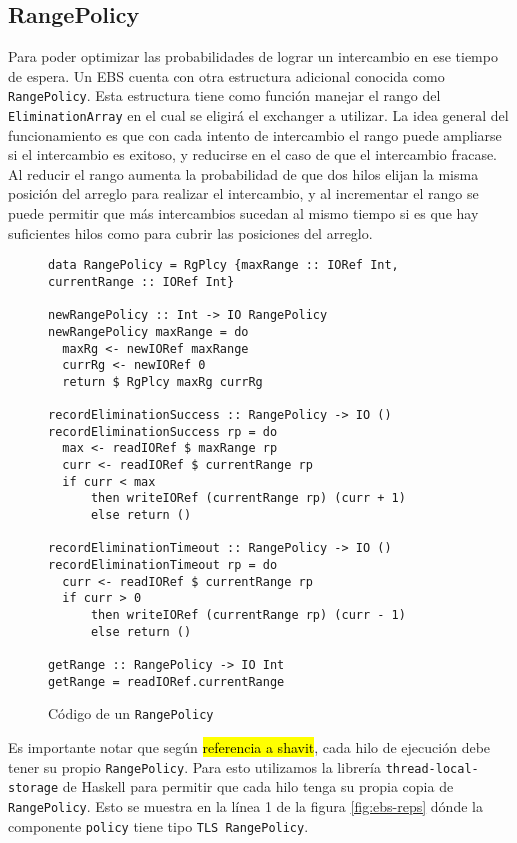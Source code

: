 \subsection{RangePolicy}
Para poder optimizar las probabilidades de lograr un intercambio en ese tiempo de espera. Un EBS cuenta con otra estructura adicional conocida como \texttt{RangePolicy}. Esta estructura tiene como función manejar el rango del \texttt{EliminationArray} en el cual se eligirá el exchanger a utilizar.
La idea general del funcionamiento es que con cada intento de intercambio el rango puede ampliarse si el intercambio es exitoso, y reducirse en el caso de que el intercambio fracase.
Al reducir el rango aumenta la probabilidad de que dos hilos elijan la misma posición del arreglo para realizar el intercambio, y al incrementar el rango se puede permitir que más intercambios sucedan al mismo tiempo si es que hay suficientes hilos como para cubrir las posiciones del arreglo.

\begin{figure}[H]
  \centering
  \begin{verbatim}
data RangePolicy = RgPlcy {maxRange :: IORef Int, currentRange :: IORef Int}

newRangePolicy :: Int -> IO RangePolicy
newRangePolicy maxRange = do
  maxRg <- newIORef maxRange
  currRg <- newIORef 0
  return $ RgPlcy maxRg currRg

recordEliminationSuccess :: RangePolicy -> IO ()
recordEliminationSuccess rp = do
  max <- readIORef $ maxRange rp
  curr <- readIORef $ currentRange rp
  if curr < max
      then writeIORef (currentRange rp) (curr + 1)
      else return ()

recordEliminationTimeout :: RangePolicy -> IO ()
recordEliminationTimeout rp = do
  curr <- readIORef $ currentRange rp
  if curr > 0
      then writeIORef (currentRange rp) (curr - 1)
      else return ()

getRange :: RangePolicy -> IO Int
getRange = readIORef.currentRange
  \end{verbatim}
  \caption{Código de un \texttt{RangePolicy}}
  \label{fig:range-policy}
\end{figure}

Es importante notar que según \hl{referencia a shavit}, cada hilo de ejecución debe tener su propio \texttt{RangePolicy}. Para esto utilizamos la librería \texttt{thread-local-storage} de Haskell para permitir que cada hilo tenga su propia copia de \texttt{RangePolicy}. Esto se muestra en la línea 1 de la figura \ref{fig:ebs-reps} dónde la componente \texttt{policy} tiene tipo \texttt{TLS RangePolicy}.

